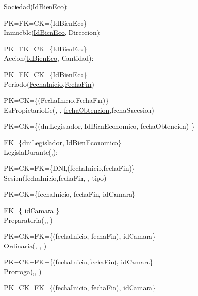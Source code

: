 Sociedad(\underline{IdBienEco}):

PK=FK=CK={\{IdBienEco}\}\\

Inmueble(\underline{IdBienEco}, Direccion):

PK=FK=CK={\{IdBienEco}\}\\

Accion(\underline{IdBienEco}, Cantidad):

PK=FK=CK={\{IdBienEco}\}\\

Periodo(\underline{FechaInicio},\underline{FechaFin})

PK=CK={\{(FechaInicio,FechaFin)}\}\\

EsPropietarioDe(\underline{}, \underline{}, \underline{fechaObtencion},fechaSucesion)

PK=CK={\{(dniLegislador, IdBienEconomico, fechaObtencion) }\}

FK={\{dniLegislador, IdBienEconomico}\}\\

LegislaDurante(\underline{},\underline{}):

PK=CK=FK={\{DNI,(fechaInicio,fechaFin)}\}\\

Sesion(\underline{fechaInicio},\underline{fechaFin}, \underline{}, tipo)

PK=CK={\{fechaInicio, fechaFin, idCamara}\}

FK={\{ idCamara }\} \\

Preparatoria(\underline{},\underline{}, \underline{})

PK=CK=FK={\{(fechaInicio, fechaFin), idCamara}\}\\

Ordinaria(\underline{}, \underline{}, \underline{})

PK=CK=FK={\{(fechaInicio,fechaFin), idCamara}\}\\

Prorroga(\underline{},\underline{}, \underline{})

PK=CK=FK={\{(fechaInicio, fechaFin), idCamara}\}\\

